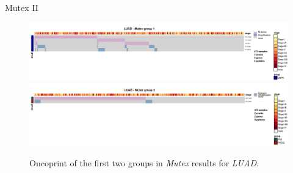 \documentclass{beamer}
\begin{document}
\begin{frame}{Mutex II}
  \begin{figure}
    \centering
    \includegraphics[scale = 0.15]{img/mutex1.jpg}
    \includegraphics[scale = 0.15]{img/mutex2.jpg}
    \caption{Oncoprint of the first two groups in \textit{Mutex} results for
      \textit{LUAD}.}   
  \end{figure}
\end{frame}
\end{document}
